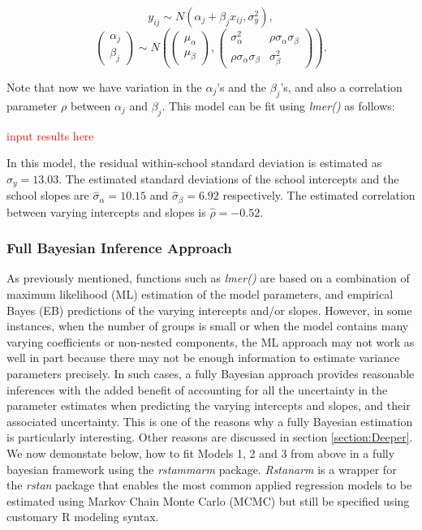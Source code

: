 $$y_{ij}\sim N(\alpha_{j}+\beta_{j}x_{ij} , \sigma_y ^2 ),$$ $$\left( \begin{matrix} \alpha _{ j } \\ \beta _{ j } \end{matrix} \right) \sim N\left( \left( \begin{matrix} { \mu  }_{ \alpha  } \\ { \mu  }_{ \beta  } \end{matrix} \right) , \left( \begin{matrix} { \sigma  }_{ \alpha  }^{ 2 } & \rho { \sigma  }_{ \alpha  }{ \sigma  }_{ \beta  } \\ \rho { \sigma  }_{ \alpha  }{ \sigma  }_{ \beta  } & { \sigma  }_{ \beta  }^{ 2 } \end{matrix} \right)  \right).$$

Note that now we have variation in the $\alpha_{j}$'s and the $\beta_{j}$'s, and also a correlation parameter $\rho$ between $\alpha_j$ and $\beta_j$. This model can be fit using \textit{lmer()} as follows:

\textcolor{red}{input results here}

In this model, the residual within-school standard deviation is estimated as $\hat{\sigma}_{y}=13.03$. The estimated standard deviations of the school intercepts and the school slopes are $\hat{\sigma}_{\alpha}= 10.15$ and $\hat{\sigma}_{\beta}=6.92$ respectively. The estimated correlation between varying intercepts and slopes is $\hat{\rho} = -0.52$. 

\subsubsection{Full Bayesian Inference Approach}
As previously mentioned, functions such as \textit{lmer()} are based on a combination of maximum likelihood (ML) estimation of the model parameters, and empirical Bayes (EB) predictions of the varying intercepts and/or slopes. However, in some instances, when the number of groups is small or when the model contains many varying coefficients or non-nested components, the ML approach may not work as well in part because there may not be enough information to estimate variance parameters precisely. In such cases, a fully Bayesian approach provides reasonable inferences with the added benefit of accounting for all the uncertainty in the parameter estimates when predicting the varying intercepts and slopes, and their associated uncertainty. This is one of the reasons why a fully Bayesian estimation is particularly interesting. Other reasons are discussed in section \ref{section:Deeper}. We now demonstate below, how to fit Models 1, 2 and 3 from above in a fully bayesian framework using the \textit{rstammarm} package. \textit{Rstanarm} is a wrapper for the \textit{rstan} package that enables the most common applied regression models to be estimated using Markov Chain Monte Carlo (MCMC) but still be specified using customary R modeling syntax.

